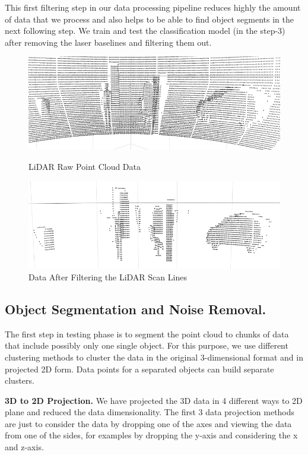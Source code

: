 This first filtering step in our data processing pipeline reduces highly the amount of data that we process and 
also helps to be able to find object segments in the next following step.
We train and test the classification model (in the step-3) after removing the laser baselines and
filtering them out.
%
\begin{figure}[!h]
\centering
\begin{minipage}{0.49\textwidth}
  \centering
        \includegraphics[width=.9\linewidth]{images/ground_before2.png}
        \caption{LiDAR Raw Point Cloud Data}
        \label{fig:ground_before}
\end{minipage}%
\begin{minipage}{0.49\textwidth}
  \centering
        \includegraphics[width=.9\linewidth]{images/ground_after2.png}
        \caption{Data After Filtering the LiDAR Scan Lines}
        \label{fig:after}
\end{minipage}%
\end{figure}
%
%
\subsection{Object Segmentation and Noise Removal.}
The first step in testing phase is to segment the point cloud to chunks of data that include
possibly only one single object. For this purpose, we use different clustering
methods to cluster the data in the original 3-dimensional format and in projected 2D form. 
Data points for a separated objects can build separate clusters. 


\textbf{3D to 2D Projection.} 
We have projected the 3D data in 4 different ways to 2D plane and reduced the data dimensionality.
The first 3 data projection methods are just to consider the data by dropping one of the axes and
viewing the data from one of the sides, for examples by dropping the y-axis and considering the x
and z-axis.

